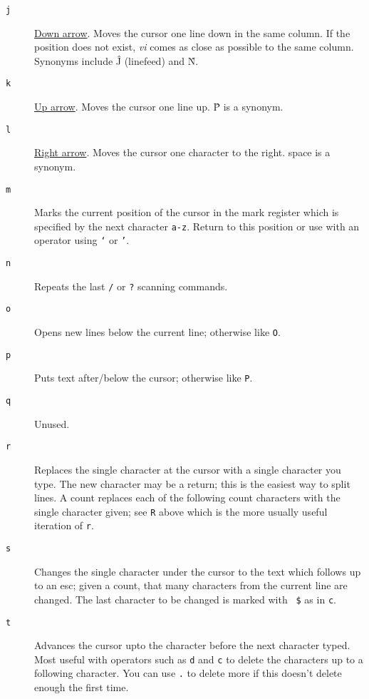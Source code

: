 \begin{description}
\item[{\tt j}] \ul{Down arrow}. Moves the cursor one line down in the same
column. If the position does not exist, {\it vi\/} comes as close as possible
to the same column. Synonyms include \^{J} (linefeed) and \^{N}.

\item[{\tt k}] \ul{Up arrow}. Moves the cursor one line up. \^{P} is a
synonym.

\item[{\tt l}] \ul{Right arrow}. Moves the cursor one character to the right.
{\sc space} is a synonym.

\item[{\tt m}] Marks the current position of the cursor in the mark register
which is specified by the next character {\tt a-z}. Return to this position or
use with an operator using {\tt `} or {\tt '}.

\item[{\tt n}] Repeats the last {\tt /} or {\tt ?} scanning commands.

\item[{\tt o}] Opens new lines below the current line; otherwise like {\tt O}.

\item[{\tt p}] Puts text after/below the cursor; otherwise like {\tt P}.

\item[{\tt q}] Unused.

\item[{\tt r}] Replaces the single character at the cursor with a single
character you type. The new character may be a {\sc return}; this is the
easiest way to split lines. A count replaces each of the following count
characters with the single character given; see {\tt R} above which is the
more usually useful iteration of {\tt r}.

\item[{\tt s}] Changes the single character under the cursor to the text which
follows up to an {\sc esc}; given a count, that many characters from the
current line are changed. The last character to be changed is marked with {\tt
\$} as in {\tt c}.

\item[{\tt t}] Advances the cursor upto the character before the next
character typed. Most useful with operators such as {\tt d} and {\tt c} to
delete the characters up to a following character. You can use {\tt .} to
delete more if this doesn't delete enough the first time.


\end{description}
